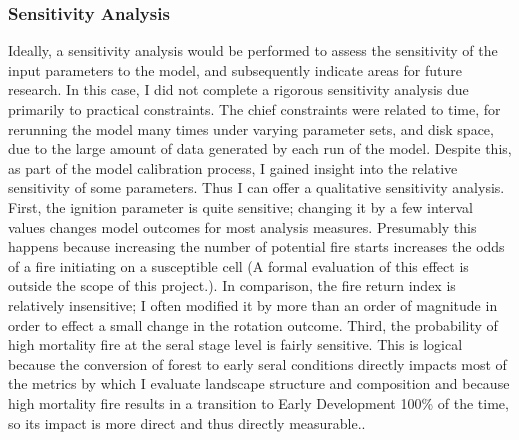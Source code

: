 \subsubsection{Sensitivity Analysis} Ideally, a sensitivity analysis would be performed to assess the sensitivity of the input parameters to the model, and subsequently indicate areas for future research. In this case, I did not complete a rigorous sensitivity analysis due primarily to practical constraints. The chief constraints were related to time, for rerunning the model many times under varying parameter sets, and disk space, due to the large amount of data generated by each run of the model. Despite this, as part of the model calibration process, I gained insight into the relative sensitivity of some parameters. Thus I can offer a qualitative sensitivity analysis. First, the ignition parameter is quite sensitive; changing it by a few interval values changes model outcomes for most analysis measures. Presumably this happens because increasing the number of potential fire starts increases the odds of a fire initiating on a susceptible cell (A formal evaluation of this effect is outside the scope of this project.). In comparison, the fire return index is relatively insensitive; I often modified it by more than an order of magnitude in order to effect a small change in the rotation outcome. Third, the probability of high mortality fire at the seral stage level is fairly sensitive. This is logical because the conversion of forest to early seral conditions directly impacts most of the metrics by which I evaluate landscape structure and composition and because high mortality fire results in a transition to Early Development 100\% of the time, so its impact is more direct and thus directly measurable..

